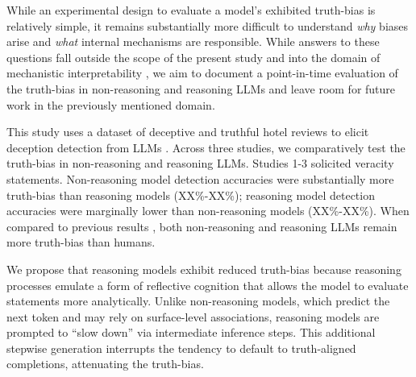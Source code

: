 \documentclass{article}
\begin{document}


While an experimental design to evaluate a model's exhibited truth-bias is relatively simple, it remains substantially more difficult to understand \textit{why} biases arise and \textit{what} internal mechanisms are responsible. While answers to these questions fall outside the scope of the present study and into the domain of mechanistic interpretability \citep{Nanda2023ProgressMF}, we aim to document a point-in-time evaluation of the truth-bias in non-reasoning and reasoning LLMs and leave room for future work in the previously mentioned domain.

This study uses a dataset of deceptive and truthful hotel reviews \citep{ott_finding_2011} to elicit deception detection from LLMs \citep{markowitz_generative_2024}. Across three studies, we comparatively test the truth-bias in non-reasoning and reasoning LLMs. Studies 1-3 solicited veracity statements. Non-reasoning model detection accuracies were substantially more truth-bias than reasoning models (XX\%-XX\%); reasoning model detection accuracies were marginally lower than non-reasoning models (XX\%-XX\%). When compared to previous results \citep{markowitz_generative_2024}, both non-reasoning and reasoning LLMs remain more truth-bias than humans.


We propose that reasoning models exhibit reduced truth-bias because reasoning processes emulate a form of reflective cognition that allows the model to evaluate statements more analytically. Unlike non-reasoning models, which predict the next token and may rely on surface-level associations, reasoning models are prompted to ``slow down'' via intermediate inference steps. This additional stepwise generation interrupts the tendency to default to truth-aligned completions, attenuating the truth-bias.
\end{document}
